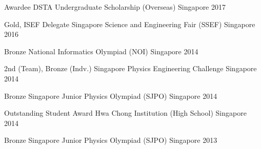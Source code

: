 

\begin{cvhonors}


\cvhonor
{Awardee} %
{DSTA Undergraduate Scholarship (Overseas)} %
{Singapore} %
{2017} %


\cvhonor
{Gold, ISEF Delegate} %
{Singapore Science and Engineering Fair (SSEF)} %
{Singapore} %
{2016} %


\cvhonor
{Bronze} %
{National Informatics Olympiad (NOI)} %
{Singapore} %
{2014} %


\cvhonor
{2nd (Team), Bronze (Indv.)} %
{Singapore Physics Engineering Challenge} %
{Singapore} %
{2014} %


\cvhonor
{Bronze} %
{Singapore Junior Physics Olympiad (SJPO)} %
{Singapore} %
{2014} %


\cvhonor
{Outstanding Student Award} %
{Hwa Chong Institution (High School)} %
{Singapore} %
{2014} %



\cvhonor
{Bronze} %
{Singapore Junior Physics Olympiad (SJPO)} %
{Singapore} %
{2013} %


\end{cvhonors}